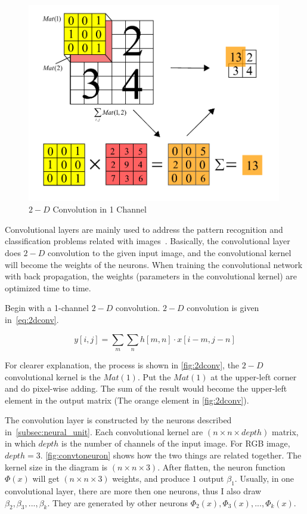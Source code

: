 \begin{spacing}{1.5}
\begin{figure}[ht]
\centering
\includegraphics[width=0.99\textwidth, fbox]{Chapter2/2dconv.pdf}
\caption{$2-D$ Convolution in 1 Channel}
\label{fig:2dconv} 
\end{figure}

Convolutional layers are mainly used to address the pattern recognition and classification problems related with images~\cite{o2015introduction}. Basically, the convolutional layer does $2-D$ convolution to the given input image, and the convolutional kernel will become the weights of the neurons. When training the convolutional network with back propagation, the weights (parameters in the convolutional kernel) are optimized time to time.

Begin with a 1-channel $2-D$ convolution. $2-D$ convolution is given in~\autoref{eq:2dconv}.

\begin{equation}
\label{eq:2dconv}
    y[i,j]= \sum_m \sum_n h[m,n] \cdot x[i-m,j-n]
\end{equation}

For clearer explanation, the process is shown in \autoref{fig:2dconv}, the $2-D$ convolutional kernel is the $Mat(1)$. Put the $Mat(1)$ at the upper-left corner and do pixel-wise adding. The sum of the result would become the upper-left element in the output matrix (The orange element in \autoref{fig:2dconv}).

The convolution layer is constructed by the neurons described in~\autoref{subsec:neural_unit}. Each convolutional kernel are $(n \times n \times depth)$ matrix, in which $depth$ is the number of channels of the input image. For RGB image, $depth = 3$. \autoref{fig:convtoneuron} shows how the two things are related together. The kernel size in the diagram is $(n \times n \times 3)$. After flatten, the neuron function $\Phi(x)$ will get $(n \times n \times 3)$ weights, and produce $1$ output $\beta_1$. Usually, in one convolutional layer, there are more then one neurons, thus I also draw $\beta_2, \beta_3, ..., \beta_k$. They are generated by other neurons $\Phi_2(x), \Phi_3(x), ..., \Phi_k(x)$.


\end{spacing}
